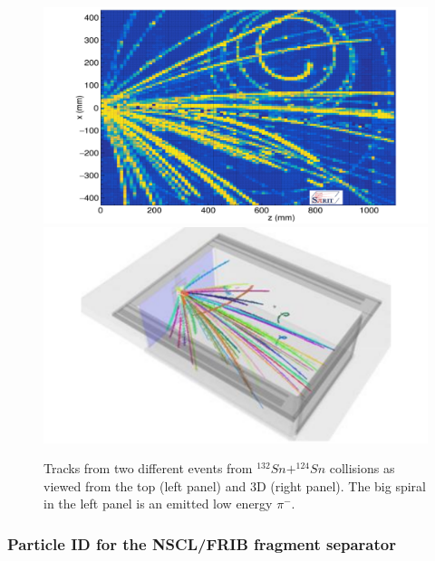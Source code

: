 \documentclass[%
10pt]{article}
\begin{document}
\begin{figure}[htb!]
\centering
\includegraphics[width=0.45\linewidth]{figures/tracks_top_view.pdf}
\includegraphics[width=0.45\linewidth]{figures/tracks_3d_view.pdf}
\caption{
Tracks from two different events from $^{132}Sn+^{124}Sn$ collisions as viewed from the top (left panel) and 3D (right panel). The big spiral in the left panel is an emitted low energy $\pi^-$.
}
\end{figure}

\clearpage
\newpage

\subsubsection{Particle ID for the NSCL/FRIB fragment separator}

\vspace{5mm}
\end{document}
